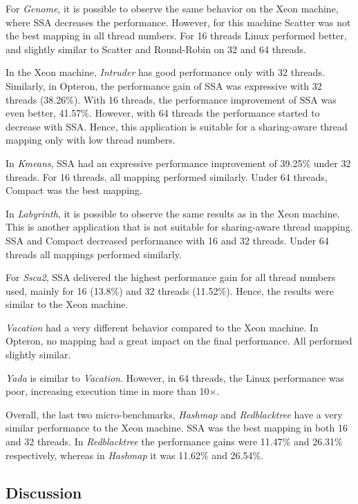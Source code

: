 For \emph{Genome}, it is possible to observe the same behavior on the Xeon machine, where SSA decreases the performance. However, for this machine Scatter was not the best mapping in all thread numbers. For 16 threads Linux performed better, and slightly similar to Scatter and Round-Robin on 32 and 64 threads.

In the Xeon machine, \emph{Intruder} has good performance only with 32 threads. Similarly, in Opteron, the performance gain of SSA was expressive with 32 threads (38.26\%). With 16 threads, the performance improvement of SSA was even better, 41.57\%.  However, with 64 threads the performance started to decrease with SSA. Hence, this application is suitable for a sharing-aware thread mapping only with low thread numbers.

In \emph{Kmeans}, SSA had an expressive performance improvement of 39.25\% under 32 threads. For 16 threads, all mapping performed similarly. Under 64 threads, Compact was the best mapping.

In \emph{Labyrinth}, it is possible to observe the same results as in the Xeon machine. This is another application that is not suitable for sharing-aware thread mapping. SSA and Compact decreased performance with 16 and 32 threads. Under 64 threads all mappings performed similarly.

For \emph{Ssca2}, SSA delivered the highest performance gain for all thread numbers used, mainly for 16 (13.8\%) and 32 threads (11.52\%). Hence, the results were similar to the Xeon machine.

\emph{Vacation} had a very different behavior compared to the Xeon machine. In Opteron, no mapping had a great impact on the final performance. All performed slightly similar.

\emph{Yada} is similar to \emph{Vacation}. However, in 64 threads, the Linux performance was poor, increasing execution time in more than 10$\times$.

Overall, the last two micro-benchmarks, \emph{Hashmap} and \emph{Redblacktree} have a
very similar performance to the Xeon machine. SSA was the best mapping in both 16 and 32 threads. In \emph{Redblacktree} the performance gains were 11.47\% and 26.31\% respectively, whereas in \emph{Hashmap} it was 11.62\% and 26.54\%.

\subsection{Discussion}

